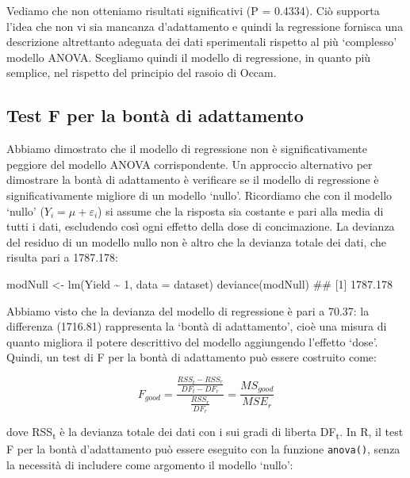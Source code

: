 \documentclass[a4paper,12pt,oneside]{book}
\newenvironment{Shaded}{\begin{snugshade}}{\end{snugshade}}
\newcommand{\DecValTok}[1]{#1}
\newcommand{\SpecialCharTok}[1]{#1}
\newcommand{\DocumentationTok}[1]{#1}
\newcommand{\OtherTok}[1]{#1}
\newcommand{\FunctionTok}[1]{#1}
\newcommand{\AttributeTok}[1]{#1}
\newcommand{\NormalTok}[1]{#1}
\begin{document}
Vediamo che non otteniamo risultati significativi (P = 0.4334). Ciò supporta l'idea che non vi sia mancanza d'adattamento e quindi la regressione fornisca una descrizione altrettanto adeguata dei dati sperimentali rispetto al più `complesso' modello ANOVA. Scegliamo quindi il modello di regressione, in quanto più semplice, nel rispetto del principio del rasoio di Occam.

\hypertarget{test-f-per-la-bontuxe0-di-adattamento}{%
\subsection{Test F per la bontà di adattamento}\label{test-f-per-la-bontuxe0-di-adattamento}}

Abbiamo dimostrato che il modello di regressione non è significativamente peggiore del modello ANOVA corrispondente. Un approccio alternativo per dimostrare la bontà di adattamento è verificare se il modello di regressione è significativamente migliore di un modello `nullo'. Ricordiamo che con il modello `nullo' (\(Y_i = \mu + \varepsilon_i\)) si assume che la risposta sia costante e pari alla media di tutti i dati, escludendo così ogni effetto della dose di concimazione. La devianza del residuo di un modello nullo non è altro che la devianza totale dei dati, che risulta pari a 1787.178:

\begin{Shaded}
\begin{Highlighting}[]
\NormalTok{modNull }\OtherTok{\textless{}{-}} \FunctionTok{lm}\NormalTok{(Yield }\SpecialCharTok{\textasciitilde{}} \DecValTok{1}\NormalTok{, }\AttributeTok{data =}\NormalTok{ dataset)}
\FunctionTok{deviance}\NormalTok{(modNull)}
\DocumentationTok{\#\# [1] 1787.178}
\end{Highlighting}
\end{Shaded}

Abbiamo visto che la devianza del modello di regressione è pari a 70.37: la differenza (1716.81) rappresenta la `bontà di adattamento', cioè una misura di quanto migliora il potere descrittivo del modello aggiungendo l'effetto `dose'. Quindi, un test di F per la bontà di adattamento può essere costruito come:

\[ F_{good} = \frac{\frac{RSS_t - RSS_r}{DF_t - DF_r} } {\frac{RSS_r}{DF_r}} = \frac{MS_{good}}{MSE_r}\]

dove RSS\textsubscript{t} è la devianza totale dei dati con i sui gradi di liberta DF\textsubscript{t}. In R, il test F per la bontà d'adattamento può essere eseguito con la funzione \texttt{anova()}, senza la necessità di includere come argomento il modello `nullo':
\end{document}
